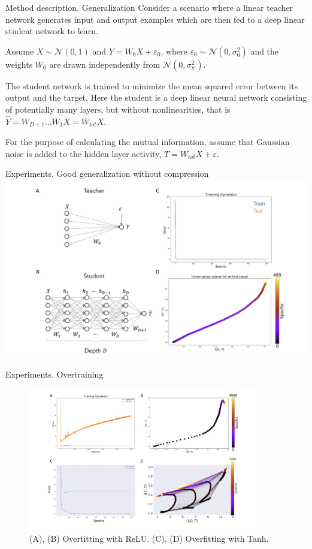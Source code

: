 \documentclass[13pt]{beamer}				\usepackage{graphicx}
\begin{document}
\begin{frame}{Method description. Generalization}
Consider a scenario where a linear teacher network generates input and output examples
which are then fed to a deep linear student network to learn. 

Assume $X \sim \mathcal{N}(0, 1)$ and $Y = W_0 X + \varepsilon_0$, where $\varepsilon_0 \sim \mathcal{N}(0, \sigma^2_0)$ and the weights $W_0$ are drawn independently from $\mathcal{N}(0, \sigma^2_w)$. 

The student network is trained to minimize the mean squared error between its output and the target. Here the student is a deep linear neural network consisting of potentially many layers, but without nonlinearities, that is $\hat{Y} = W_{D + 1} \dots W_1 X = W_{tot} X$.

For the purpose of calculating the mutual information, assume that Gaussian noise is added to the hidden layer activity, $T = W_{tot} X + \varepsilon$.
\end{frame}

\begin{frame}{Experiments. Good generalization without compression}
\includegraphics[width=1\textwidth, trim={0 0 0 0cm},clip]{images/InfB3.jpg}
\end{frame}

\begin{frame}{Experiments. Overtraining}
\begin{figure}[h!]
    \includegraphics[width=0.9\textwidth, trim={0 0 0 0cm},clip]{images/InfB4.jpg}
    \caption{(A), (B) Overtitting with ReLU. (C), (D) Overfitting with Tanh.}
\end{figure}
\end{frame}
\end{document}

